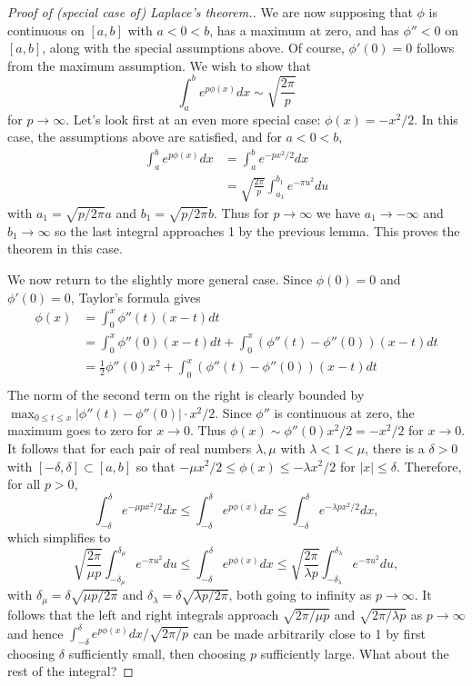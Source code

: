 \documentclass{mathnotes}
\begin{document}
\begin{proof}[Proof of (special case of) Laplace's theorem.]
    We are now supposing that $\phi$ is continuous on $[a,b]$ with $a<0<b$, has a maximum at zero, and has $\phi''<0$ on $[a,b]$,
    along with the special assumptions above. Of course, $\phi'(0)=0$ follows from the maximum assumption.
    We wish to show that
    \[\int_a^b e^{p\phi(x)} dx\sim\sqrt{\frac{2\pi}{p}}\]
    for $p\to\infty$. Let's look first at an even more special case: $\phi(x)=-x^2/2$. In this case, the assumptions
    above are satisfied, and for $a<0<b$,
    \begin{align*}
        \int_a^b e^{p\phi(x)} dx &= \int_a^be^{-px^2/2} dx\\
        &=\sqrt{\frac{2\pi}{p}}\int_{a_1}^{b_1}e^{-\pi u^2}du
    \end{align*}
    with $a_1=\sqrt{p/2\pi}a$ and $b_1=\sqrt{p/2\pi}b$. Thus for $p\to\infty$ we have $a_1\to-\infty$ and $b_1\to\infty$ so the last
    integral approaches 1 by the previous lemma. This proves the theorem in this case.
    
    We now return to the slightly more general case. Since $\phi(0)=0$ and $\phi'(0)=0$, Taylor's formula gives
    \begin{align*}
        \phi(x)&=\int_0^x\phi''(t)(x-t)dt\\
        &=\int_0^x\phi''(0)(x-t)dt+\int_0^x\left( \phi''(t)-\phi''(0) \right)(x-t)dt\\
        &=\frac{1}{2}\phi''(0)x^2+\int_0^x\left( \phi''(t)-\phi''(0) \right)(x-t)dt\\
    \end{align*}
    The norm of the second term on the right is clearly bounded by $\max_{0\leq t\leq x}|\phi''(t)-\phi''(0)|\cdot x^2/2$.
    Since $\phi''$ is continuous at zero, the maximum goes to zero for $x\to 0$. Thus $\phi(x)\sim\phi''(0)x^2/2=-x^2/2$ for
    $x\to 0$. It follows that for each pair of real numbers $\lambda,\mu$ with $\lambda<1<\mu$, there is a $\delta>0$
    with $[-\delta,\delta]\subset[a,b]$ so that $-\mu x^2/2\leq\phi(x)\leq -\lambda x^2/2$ for $|x|\leq\delta$.
    Therefore, for all $p>0$,
    \[\int_{-\delta}^\delta e^{-\mu px^2/2}dx\leq \int_{-\delta}^\delta e^{p\phi(x)}dx \leq \int_{-\delta}^\delta e^{-\lambda px^2/2}dx,\]
    which simplifies to
    \[\sqrt{\frac{2\pi}{\mu p}}\int_{-\delta_\mu}^{\delta_\mu} e^{-\pi u^2}du\leq \int_{-\delta}^\delta e^{p\phi(x)}dx \leq \sqrt{\frac{2\pi}{\lambda p}}\int_{-\delta_\lambda}^{\delta_\lambda} e^{-\pi u^2}du,\]
    with $\delta_\mu=\delta\sqrt{\mu p/2\pi}$ and $\delta_\lambda=\delta\sqrt{\lambda p/2\pi}$, both going to infinity as $p\to\infty$.
    It follows that the left and right integrals approach $\sqrt{2\pi/\mu p}$ and $\sqrt{2\pi/\lambda p}$ as $p\to\infty$ and hence
    $\int_{-\delta}^\delta e^{p\phi(x)}dx/\sqrt{2\pi/p}$ can be made arbitrarily close to 1 by first choosing $\delta$ sufficiently
    small, then choosing $p$ sufficiently large. What about the rest of the integral?


\end{proof}
\end{document}
